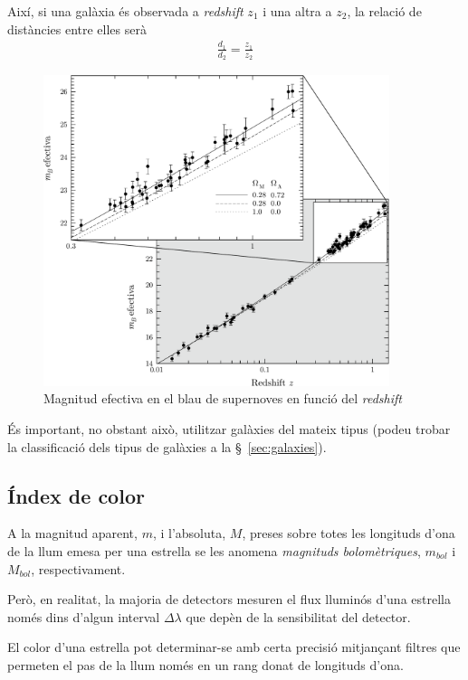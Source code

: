 Així, si una galàxia és observada a \textit{redshift} $z_{1}$ i una altra a $z_{2}$, la relació de distàncies entre elles serà
\begin{align}
	\frac{d_{1}}{d_{2}} = \frac{z_{1}}{z_{2}}
\end{align}
\begin{figure}[H]
	\centering
	\includegraphics[width=0.9\textwidth]{./images/2-supernovae-redshift}
	\caption{Magnitud efectiva en el blau de supernoves en funció del \textit{redshift}}
	\label{fig:supernovae-redshift}
\end{figure}

És important, no obstant això, utilitzar galàxies del mateix tipus (podeu trobar la classificació dels tipus de galàxies a la \S~\ref{sec:galaxies}).

\subsection{Índex de color}
A la magnitud aparent, $m$, i l'absoluta, $M$, preses sobre totes les longituds d'ona de la llum emesa per una estrella se les anomena \textit{magnituds bolomètriques}, $m_{bol}$ i $M_{bol}$, respectivament.

Però, en realitat, la majoria de detectors mesuren el flux lluminós d'una estrella només dins d'algun interval $\Delta \lambda$ que depèn de la sensibilitat del detector.

El color d'una estrella pot determinar-se amb certa precisió mitjançant filtres que permeten el pas de la llum només en un rang donat de longituds d'ona.

